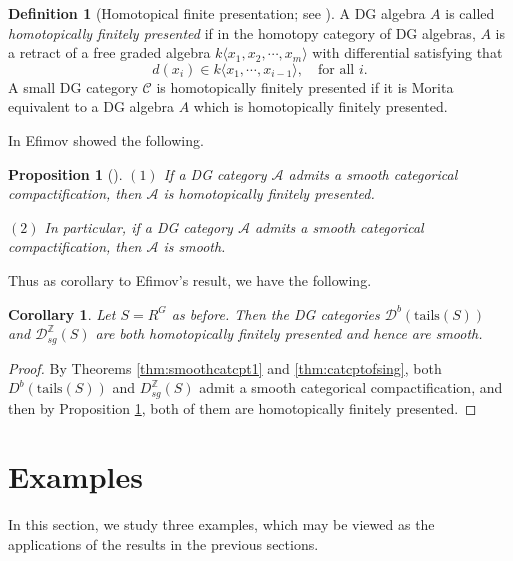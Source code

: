 \documentclass[11pt,reqno]{amsart}
\newtheorem{corollary}[theorem]{Corollary}
\newtheorem{proposition}[theorem]{Proposition}
\theoremstyle{definition}
\newtheorem{definition}[theorem]{Definition}
\begin{document}
\begin{definition}[Homotopical finite presentation; see \cite{TV}]
A DG algebra $A$ is called {\it homotopically finitely presented} if
in the homotopy category of DG algebras, $A$ is a retract of a free
graded algebra $k\langle x_1, x_2, \cdots, x_m\rangle$ with differential satisfying that
$$
d(x_i) \in k\langle x_1, \cdots, x_{i-1}\rangle, \quad\mbox{for all} \,\, i.
$$
A small DG category $\mathcal{C}$ is homotopically finitely presented if it is Morita
equivalent to a DG algebra $A$ which is homotopically finitely presented.
\end{definition}

In \cite{Efi1} Efimov showed the following.

\begin{proposition}[{\cite[Proposition 2.8]{Efi1}}]\label{fhp}
$(1)$ If a DG category $\mathcal{A}$ admits a smooth categorical compactification, then
$\mathcal{A}$ is  homotopically finitely presented.


$(2)$ In particular, if
a DG category $\mathcal{A}$ admits a smooth categorical compactification, then
$\mathcal{A}$ is smooth.
\end{proposition}

Thus as corollary to Efimov's result, we have the following.

\begin{corollary}\label{cor:main1and2}
Let $S=R^G$ as before. Then
the DG categories $\mathcal{D}^{b}(\mathrm{tails}(S))$ and 
$\mathcal{D}_{sg}^{\mathbb{Z}}(S)$ are both homotopically finitely presented and hence are smooth.
\end{corollary}

\begin{proof}
By Theorems \ref{thm:smoothcatcpt1} and \ref{thm:catcptofsing}, both 
$D^{b}(\mathrm{tails}(S))$ and 
$D_{sg}^{\mathbb{Z}}(S)$ admit a smooth categorical compactification, and then
by Proposition 
\ref{fhp}, both of them
are homotopically finitely presented. 
\end{proof}






\section{Examples}\label{EA}

In this section, we study three examples, which may be viewed as the applications
of the results in the previous sections.
\end{document}
